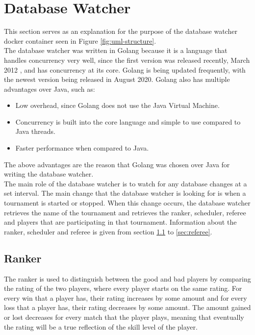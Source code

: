 \documentclass[a4paper, 11pt]{report}
\begin{document}
\section{Database Watcher}

This section serves as an explanation for the purpose of the database watcher
docker container seen in Figure \ref{fig:uml-structure}. \\

The database watcher was written in Golang because it is a language that handles
concurrency very well, since the first version was released recently, March 2012
\cite{golang}, and has concurrency at its core. Golang is being updated frequently,
with the newest version being released in August 2020. Golang also has multiple
advantages over Java, such as:
\begin{itemize}
	\item Low overhead, since Golang does not use the Java Virtual Machine.
	\item Concurrency is built into the core language and simple to use compared
	to Java threads.
	\item Faster performance when compared to Java.
\end{itemize}
The above advantages are the reason that Golang was chosen over Java for writing
the database watcher. \\

The main role of the database watcher is to watch for any database changes at a
set interval. The main change that the database watcher is looking for is when a
tournament is started or stopped. When this change occurs, the database watcher
retrieves the name of the tournament and retrieves the ranker, scheduler, referee
and players that are participating in that tournament. Information about the
ranker, scheduler and referee is given from section \ref{sec:ranker} to
\ref{sec:referee}.

\subsection{Ranker}
\label{sec:ranker}

The ranker is used to distinguish between the good and bad players by comparing
the rating of the two players, where every player starts on the same rating.
For every win that a player has, their rating increases by some amount and
for every loss that a player has, their rating decreases by some amount. The
amount gained or lost decreases for every match that the player plays, meaning
that eventually the rating will be a true reflection of the skill level of the
player. \\
\end{document}
